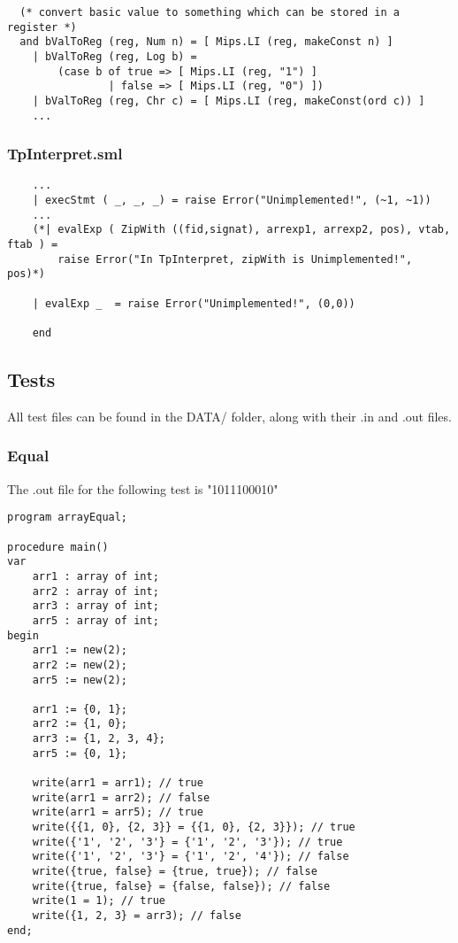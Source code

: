 \documentclass[12pt]{article}
\begin{document}
\begin{lstlisting}
  (* convert basic value to something which can be stored in a register *)
  and bValToReg (reg, Num n) = [ Mips.LI (reg, makeConst n) ]
    | bValToReg (reg, Log b) = 
        (case b of true => [ Mips.LI (reg, "1") ]
                | false => [ Mips.LI (reg, "0") ])
    | bValToReg (reg, Chr c) = [ Mips.LI (reg, makeConst(ord c)) ]
    ...
\end{lstlisting}

\subsubsection{TpInterpret.sml}

\begin{lstlisting}
    ...
    | execStmt ( _, _, _) = raise Error("Unimplemented!", (~1, ~1))
    ...
    (*| evalExp ( ZipWith ((fid,signat), arrexp1, arrexp2, pos), vtab, ftab ) =
        raise Error("In TpInterpret, zipWith is Unimplemented!", pos)*)
        
    | evalExp _  = raise Error("Unimplemented!", (0,0))
    
    end
\end{lstlisting}

\pagebreak

\subsection{Tests}

All test files can be found in the DATA/ folder, along with their .in and .out files.

\subsubsection{Equal}

The .out file for the following test is "1011100010"

\begin{lstlisting}[caption=arrayEqual.pal]
program arrayEqual;

procedure main()
var
    arr1 : array of int;
    arr2 : array of int;
    arr3 : array of int;
    arr5 : array of int;
begin
    arr1 := new(2);
    arr2 := new(2);
    arr5 := new(2);

    arr1 := {0, 1};
    arr2 := {1, 0};
    arr3 := {1, 2, 3, 4};
    arr5 := {0, 1};

    write(arr1 = arr1); // true
    write(arr1 = arr2); // false
    write(arr1 = arr5); // true
    write({{1, 0}, {2, 3}} = {{1, 0}, {2, 3}}); // true
    write({'1', '2', '3'} = {'1', '2', '3'}); // true
    write({'1', '2', '3'} = {'1', '2', '4'}); // false
    write({true, false} = {true, true}); // false
    write({true, false} = {false, false}); // false
    write(1 = 1); // true
    write({1, 2, 3} = arr3); // false
end;
\end{lstlisting}
\end{document}
